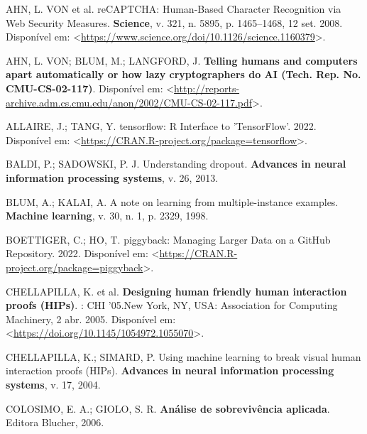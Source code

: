 \documentclass[12pt,twoside,brazilian]{book}
\newlength{\cslhangindent}
\newlength{\cslentryspacingunit} %
\newenvironment{CSLReferences}[2] %
 {%
  \setlength{\parindent}{0pt}
  \ifodd #1
  \let\oldpar\par
  \def\par{\hangindent=\cslhangindent\oldpar}
  \fi
  \setlength{\parskip}{#2\cslentryspacingunit}
 }%
 {}
\begin{document}
\hypertarget{refs}{}
\begin{CSLReferences}{0}{1}
\leavevmode{}%
AHN, L. VON et al. reCAPTCHA: Human-Based Character Recognition via Web
Security Measures. \textbf{Science}, v. 321, n. 5895, p. 1465--1468, 12
set. 2008. Disponível em:
\textless{}\url{https://www.science.org/doi/10.1126/science.1160379}\textgreater.

\leavevmode{}%
AHN, L. VON; BLUM, M.; LANGFORD, J. \textbf{Telling humans and computers
apart automatically or how lazy cryptographers do AI (Tech. Rep. No.
CMU-CS-02-117)}. Disponível em:
\textless{}\url{http://reports-archive.adm.cs.cmu.edu/anon/2002/CMU-CS-02-117.pdf}\textgreater.

\leavevmode{}%
ALLAIRE, J.; TANG, Y. tensorflow: R Interface to 'TensorFlow'. 2022.
Disponível em:
\textless{}\url{https://CRAN.R-project.org/package=tensorflow}\textgreater.

\leavevmode{}%
BALDI, P.; SADOWSKI, P. J. Understanding dropout. \textbf{Advances in
neural information processing systems}, v. 26, 2013.

\leavevmode{}%
BLUM, A.; KALAI, A. A note on learning from multiple-instance examples.
\textbf{Machine learning}, v. 30, n. 1, p. 2329, 1998.

\leavevmode{}%
BOETTIGER, C.; HO, T. piggyback: Managing Larger Data on a GitHub
Repository. 2022. Disponível em:
\textless{}\url{https://CRAN.R-project.org/package=piggyback}\textgreater.

\leavevmode{}%
CHELLAPILLA, K. et al. \textbf{Designing human friendly human
interaction proofs (HIPs)}. : CHI '05.New York, NY, USA: Association for
Computing Machinery, 2 abr. 2005. Disponível em:
\textless{}\url{https://doi.org/10.1145/1054972.1055070}\textgreater.

\leavevmode{}%
CHELLAPILLA, K.; SIMARD, P. Using machine learning to break visual human
interaction proofs (HIPs). \textbf{Advances in neural information
processing systems}, v. 17, 2004.

\leavevmode{}%
COLOSIMO, E. A.; GIOLO, S. R. \textbf{Análise de sobrevivência
aplicada}. Editora Blucher, 2006.


\end{CSLReferences}
\end{document}
